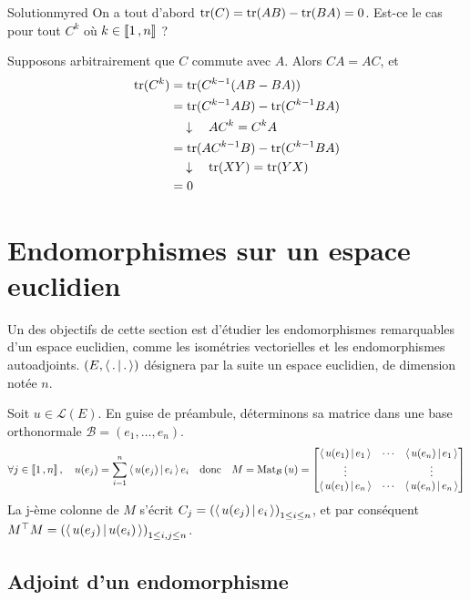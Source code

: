     \begin{demo}{Solution}{myred}
        On a tout d’abord $\operatorname{tr}(C) = \operatorname{tr}(AB) - \operatorname{tr}(BA) = 0$. Est-ce le cas pour tout $C^k$ où $k \in \left\llbracket 1 \, , n \right\rrbracket$ ? 

        Supposons arbitrairement que $C$ commute avec $A$. Alors $CA = AC$, et
        \begin{align*}
            \operatorname{tr}(C^k) 
            &= \operatorname{tr}(C^{k-1}(AB - BA)) \\
            &= \operatorname{tr}(C^{k-1} AB) - \operatorname{tr}(C^{k-1} BA) \\
            &\quad \downarrow \quad A C^k = C^k A \\
            &= \operatorname{tr}(A C^{k-1} B) - \operatorname{tr}(C^{k-1} BA) \\ 
            &\quad \downarrow \quad \operatorname{tr}(XY) = \operatorname{tr}(YX) \\
            &= 0
        \end{align*} 
    \end{demo}

\section[Endom. sur un espace euclidien]{Endomorphismes sur un espace euclidien}

Un des objectifs de cette section est d’étudier les endomorphismes remarquables d’un espace euclidien, comme les isométries vectorielles et les endomorphismes autoadjoints. $\left(E, \left<\,.\,\middle|\,.\,\right>\right)$ désignera par la suite un espace euclidien, de dimension notée $n$.

Soit $u \in \mathcal{L}(E)$. En guise de préambule, déterminons sa matrice dans une base orthonormale $\mathcal{B} = (e_1,\ldots,e_n)$. 
\[ \forall j \in \left\llbracket 1 \, , n \right\rrbracket, \quad u(e_j) = \sum_{i=1}^{n} \left<\,u(e_j)\,\middle|\,e_i\,\right> e_i \quad \text{donc} \quad M = \text{Mat}_{\mathcal{B}}\left(u\right) = \begin{bmatrix}
    \left<\,u(e_1)\,\middle|\,e_1\,\right> & \cdots & \left<\,u(e_n)\,\middle|\,e_1\,\right> \\
    \vdots & & \vdots \\
    \left<\,u(e_1)\,\middle|\,e_n\,\right> & \cdots & \left<\,u(e_n)\,\middle|\,e_n\,\right> 
\end{bmatrix} \]    
La j-ème colonne de $M$ s’écrit $C_j = \left(\left<\,u(e_j)\,\middle|\,e_i\,\right>\right)_{1 \leq i \leq n}$, et par conséquent $M^{\top} M = \left(\left<\,u(e_j)\,\middle|\,u(e_i)\,\right>\right)_{1 \leq i,j \leq n}$.

\subsection{Adjoint d’un endomorphisme}

